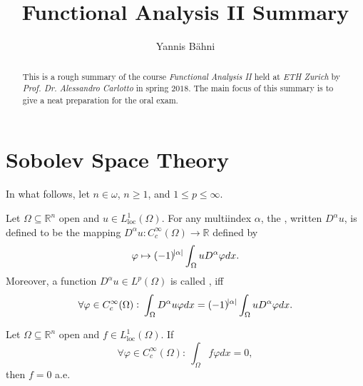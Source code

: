 

\setcounter{section}{1}

\title{Functional Analysis II Summary}
\author{Yannis B\"{a}hni}
\address[Yannis B\"{a}hni]{University of Zurich, R\"{a}mistrasse 71, 8006 Zurich}



\begin{abstract}
	This is a rough summary of the course \emph{Functional Analysis II} held at \emph{ETH Zurich} by \emph{Prof. Dr. Alessandro Carlotto} in spring $2018$. The main focus of this summary is to give a neat preparation for the oral exam.
\end{abstract}

\maketitle

\tableofcontents

\section*{Sobolev Space Theory}
In what follows, let $n \in \omega$, $n \geq 1$, and $1 \leq p \leq \infty$.

\begin{definition}
	Let $\Omega \subseteq \mathbb{R}^n$ open and $u \in L^1_{\mathrm{loc}}(\Omega)$. For any multiindex $\alpha$, the , written $D^\alpha u$, is defined to be the mapping $D^\alpha u : C^\infty_c(\Omega) \to \mathbb{R}$ defined by
	\begin{equation*}
		\varphi \mapsto (-1)^{\abs{\alpha}}\int_\Omega u D^\alpha \varphi dx.
	\end{equation*}
	Moreover, a function $D^\alpha u \in L^p(\Omega)$ is called , iff
	\begin{equation*}
		\forall \varphi \in C^\infty_c(\Omega): \> \int_\Omega D^\alpha u \varphi dx =  (-1)^{\abs{\alpha}} \int_\Omega u D^\alpha \varphi dx.
	\end{equation*}
\end{definition}

\begin{theorem}
	\label{thm:flvc}
	Let $\Omega \subseteq \mathbb{R}^n$ open and $f \in L^1_{\mathrm{loc}}(\Omega)$. If
	\begin{equation*}
		\forall \varphi \in C^\infty_c(\Omega) : \> \int_\Omega f \varphi dx = 0,
	\end{equation*}
	\noindent then $f = 0$ a.e.
\end{theorem}

